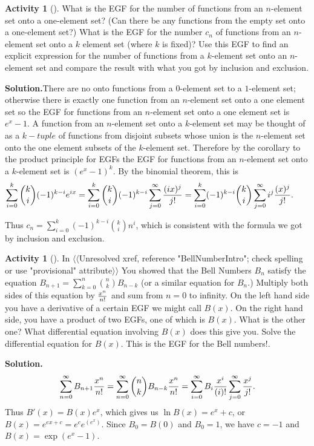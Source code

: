 \documentclass[10pt,]{book}
\theoremstyle{plain}
\theoremstyle{definition}
\newtheorem{activity}[project]{Activity}
\numberwithin{equation}{chapter}
\begin{document}
\begin{activity}[]\label{activity-105}
What is the EGF for the number of functions from an \(n\)-element set onto a one-element set? (Can there be any functions from the empty set onto a one-element set?) What is the EGF for the number \(c_n\) of functions from an \(n\)-element set onto a \(k\) element set (where \(k\) is fixed)? Use this EGF to find an explicit expression for the number of functions from a \(k\)-element set onto an \(n\)-element set and compare the result with what you got by inclusion and exclusion.%
\par\medskip\noindent%
\textbf{Solution.}\quad There are no onto functions from a \(0\)-element set to a \(1\)-element set; otherwise there is exactly one function from an \(n\)-element set onto a one element set so the EGF for functions from an \(n\)-element set onto a one element set is \(e^x-1\). A function from an \(n\)-element set onto a \(k\)-element set may be thought of as a \(k-tuple\) of functions from disjoint subsets whose union is the \(n\)-element set onto the one element subsets of the \(k\)-element set. Therefore by the corollary to the product principle for EGFs the EGF for functions from an \(n\)-element set onto a \(k\)-element set is \((e^x-1)^k\). By the binomial theorem, this is%
\begin{equation*}
\kern-.25 in\sum_{i=0}^k{k\choose i}(-1)^{k-i}e^{ix} 
=
\sum_{i=0}^k {k\choose i} (-1)^{k-i} \sum_{j=0}^\infty {(ix)^j\over j!} = 
\sum_{i=0}^k (-1)^{k-i}{k\choose i} \sum_{j=0}^\infty i^j{(x)^j\over
j!}.
\end{equation*}
%
\par
Thus \(c_n= \sum_{i=0}^k(-1)^{k-i}{k\choose i}n^i\), which is consistent with the formula we got by inclusion and exclusion.%
\end{activity}
\begin{activity}[]\label{BellNumbersEGF}
In {$\langle\langle$Unresolved xref, reference "BellNumberIntro"; check spelling or use "provisional" attribute$\rangle\rangle$} You showed that the Bell Numbers \(B_n\) satisfy the equation \(B_{n+1} =
\sum_{k=0}^{n} {n\choose k}B_{n-k}\) (or a similar equation for \(B_n\).) Multiply both sides of this equation by \(x^n\over n!\) and sum from \(n=0\) to infinity. On the left hand side you have a derivative of a certain EGF we might call \(B(x)\). On the right hand side, you have a product of two EGFs, one of which is \(B(x)\). What is the other one? What differential equation involving \(B(x)\) does this give you. Solve the differential equation for \(B(x)\). This is the EGF for the Bell numbers!.%
\par\medskip\noindent%
\textbf{Solution.}\quad %
\begin{equation*}
\sum_{n=0}^\infty B_{n+1}{x^n\over n!} = \sum_{n=0}^\infty{n\choose
k}B_{n-k}{x^n\over n!} =\sum_{i=0}^\infty B_{i}{x^{i}\over
(i)!}\sum_{j=0}^\infty {x^j\over j!}.
\end{equation*}
Thus \(B'(x) = B(x)e^x\), which gives us \(\ln B(x) = e^x+c\), or \(B(x) =
e^{ex+c} =e^ce^{(e^x)}\). Since \(B_0=B(0)\) and \(B_0=1\), we have \(c=-1\) and \(B(x) = \exp(e^x-1)\).%
\end{activity}
\end{document}
